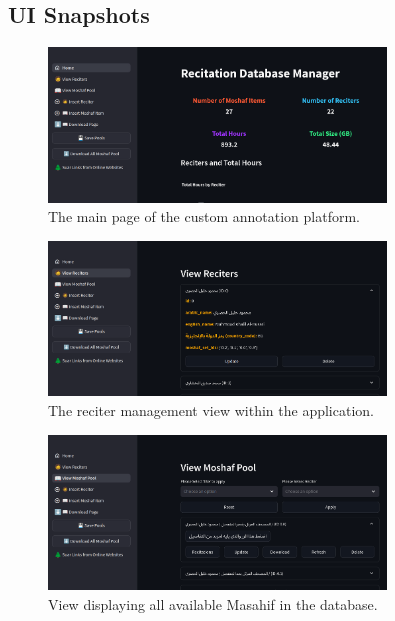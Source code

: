 \subsection{UI Snapshots}

\begin{figure}[H]
\centering
\includegraphics[width=0.8\textwidth]{../figures/ui_main_page.png}
\caption{The main page of the custom annotation platform.}
\label{fig:ui_main}
\end{figure}

\begin{figure}[H]
\centering
\includegraphics[width=0.8\textwidth]{../figures/ui_veiw_reciters.png}
\caption{The reciter management view within the application.}
\label{fig:ui_reciters}
\end{figure}

\begin{figure}[H]
\centering
\includegraphics[width=0.8\textwidth]{../figures/ui_veiw_all_moshaf.png}
\caption{View displaying all available Masahif in the database.}
\label{fig:ui_masahif}
\end{figure}

